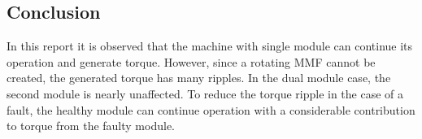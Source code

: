 \documentclass{article}
\begin{document}
\subsection{Conclusion}

In this report it is observed that the machine with single module can continue its operation and generate torque. However, since a rotating MMF cannot be created, the generated torque has many ripples. 
In the dual module case, the second module is nearly unaffected. To reduce the torque ripple in the case of a fault, the healthy module can continue operation with a considerable contribution to torque from the faulty module.



\end{document}

